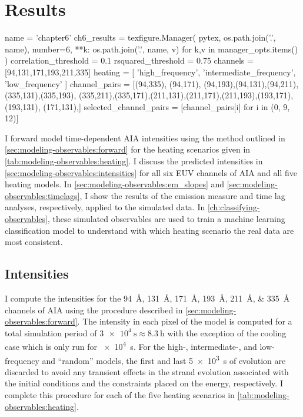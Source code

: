 \section{Results}\label{sec:modeling-observables:results}

\begin{pycode}
name = 'chapter6'
ch6_results = texfigure.Manager(
    pytex,
    os.path.join('.', name),
    number=6,
    **{k: os.path.join('.', name, v) for k,v in manager_opts.items()}
)
correlation_threshold = 0.1
rsquared_threshold = 0.75
channels = [94,131,171,193,211,335]
heating = [ 'high_frequency', 'intermediate_frequency', 'low_frequency' ]
channel_pairs = [(94,335), (94,171), (94,193),(94,131),(94,211),(335,131),(335,193),
				 (335,211),(335,171),(211,131),(211,171),(211,193),(193,171),(193,131),
				 (171,131),]
selected_channel_pairs = [channel_pairs[i] for i in (0, 9, 12)]
\end{pycode}

I forward model time-dependent AIA intensities using the method outlined in \autoref{sec:modeling-observables:forward} for the heating scenarios given in \autoref{tab:modeling-observables:heating}. I discuss the predicted intensities in \autoref{sec:modeling-observables:intensities} for all six EUV channels of AIA and all five heating models. In \autoref{sec:modeling-observables:em_slopes} and \autoref{sec:modeling-observables:timelags}, I show the results of the emission measure and time lag analyses, respectively, applied to the simulated data. In \autoref{ch:classifying-observables},  these simulated observables are used to train a machine learning classification model to understand with which heating scenario the real data are most consistent.

\subsection{Intensities}\label{sec:modeling-observables:intensities}

I compute the intensities for the \SIlist{94;131;171;193;211;335}{\angstrom} channels of AIA using the procedure described in \autoref{sec:modeling-observables:forward}. The intensity in each pixel of the model \AR{} is computed for a total simulation period of $\SI{3e4}{\second}\approx\SI{8.3}{\hour}$ with the exception of the cooling case which is only run for \SI{e4}{\second}. For the high-, intermediate-, and low-frequency and ``random'' models, the first and last \SI{5e3}{\second} of evolution are discarded to avoid any transient effects in the strand evolution associated with the initial conditions and the constraints placed on the energy, respectively. I complete this procedure for each of the five heating scenarios in \autoref{tab:modeling-observables:heating}.

